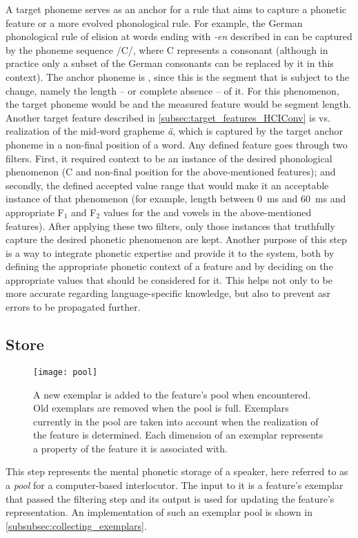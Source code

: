 A target phoneme serves as an anchor for a rule that aims to capture a phonetic feature or a more evolved phonological rule.
For example, the German phonological rule of \textipa{[@]} elision at words ending with \emph{-en} described in  can be captured by the phoneme sequence /C/, where C represents a consonant (although in practice only a subset of the German consonants can be replaced by it in this context).
The anchor phoneme is \textipa{[@]}, since this is the segment that is subject to the change, namely the length -- or complete absence -- of it.
For this phenomenon, the target phoneme would be  and the measured feature would be segment length.
Another target feature described in \cref{subsec:target_features_HCIConv} is \textipa{[e:]} vs.\ \textipa{[E:]} realization of the mid-word grapheme \emph{ä}, which is captured by the target anchor phoneme \textipa{[E]} in a non-final position of a word.
Any defined feature goes through two filters. First, it required context to be an instance of the desired phonological phenomenon (C and non-final position for the above-mentioned features);
and secondly, the defined accepted value range that would make it an acceptable instance of that phenomenon (for example, \textipa{[@]} length between \SI{0}{\milli\second} and \SI{60}{\milli\second} and appropriate F$_1$ and F$_2$ values for the \textipa{[e:]} and \textipa{[E:]} vowels in the above-mentioned features).
After applying these two filters, only those instances that truthfully capture the desired phonetic phenomenon are kept.
Another purpose of this step is a way to integrate phonetic expertise and provide it to the system, both by defining the appropriate phonetic context of a feature and by deciding on the appropriate values that should be considered for it.
This helps not only to be more accurate regarding language-specific knowledge, but also to prevent \ac{asr} errors to be propagated further.

\subsection{Store}
\label{subsec:store}

\begin{figure}[t]
	\centering
	\texttt{[image: pool]}
	\caption[The exemplar pool]
		{A new exemplar is added to the feature's pool when encountered.
		Old exemplars are removed when the pool is full.
		Exemplars currently in the pool are taken into account when the realization of the feature is determined.
		Each dimension of an exemplar represents a property of the feature it is associated with.}
	\label{fig:exemplar_pool}
\end{figure}
%
This step represents the mental phonetic storage of a speaker, here referred to as a \emph{pool} for a computer-based interlocutor.
The input to it is a feature's exemplar that passed the filtering step and its output is used for updating the feature's representation.
An implementation of such an exemplar pool is shown in \cref{subsubsec:collecting_exemplars}.

